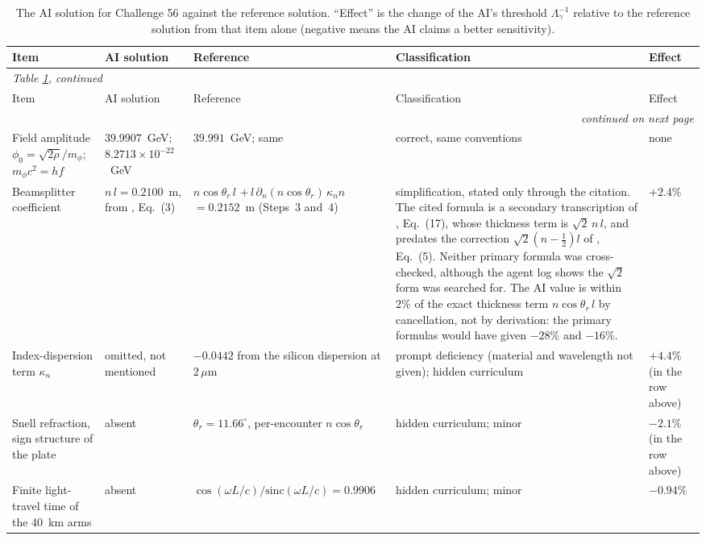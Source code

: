 \begingroup\footnotesize\setlength{\tabcolsep}{4pt}
\begin{longtable}{p{3.0cm}p{3.1cm}p{3.4cm}p{4.2cm}p{1.9cm}}
\caption{The AI solution for Challenge 56 against the reference solution. ``Effect'' is the change of the AI's threshold $\Lambda_\gamma^{-1}$ relative to the reference solution from that item alone (negative means the AI claims a better sensitivity).}\label{tab:ai56}\\
\toprule Item & AI solution & Reference & Classification & Effect \\ \midrule\midrule
\endfirsthead
\multicolumn{5}{l}{\textit{Table \ref{tab:ai56}, continued}}\\ \toprule Item & AI solution & Reference & Classification & Effect \\ \midrule\midrule
\endhead
\midrule \multicolumn{5}{r}{\textit{continued on next page}}\\
\endfoot
\bottomrule
\endlastfoot
Field amplitude $\phi_0=\sqrt{2\rho}/m_\phi$; $m_\phi c^2=hf$ & $39.9907$~GeV; $8.2713\times10^{-22}$~GeV & $39.991$~GeV; same & correct, same conventions & none \\
\midrule
Beamsplitter coefficient & $n\,l=0.2100$~m, from \citet{Miller2022}, Eq.~(3) & $n\cos\theta_r\,l$ \newline $+\,l\,\partial_n(n\cos\theta_r)\,\kappa_n n$ \newline $=0.2152$~m (Steps~3 and~4) & simplification, stated only through the citation. The cited formula is a secondary transcription of \citet{GroteStadnik2019}, Eq.~(17), whose thickness term is $\sqrt2\,n\,l$, and predates the correction $\sqrt2(n-\tfrac12)l$ of \citet{Vermeulen2021}, Eq.~(5). Neither primary formula was cross-checked, although the agent log shows the $\sqrt2$ form was searched for. The AI value is within $2\%$ of the exact thickness term $n\cos\theta_r\,l$ by cancellation, not by derivation: the primary formulas would have given $-28\%$ and $-16\%$. & $+2.4\%$ \\
\midrule
Index-dispersion term $\kappa_n$ & omitted, not mentioned & $-0.0442$ from the silicon dispersion at $2\,\mu$m & prompt deficiency (material and wavelength not given); hidden curriculum & $+4.4\%$ (in the row above) \\
\midrule
Snell refraction, sign structure of the plate & absent & $\theta_r=11.66^\circ$, per-encounter $n\cos\theta_r$ & hidden curriculum; minor & $-2.1\%$ (in the row above) \\
\midrule
Finite light-travel time of the $40$~km arms & absent & $\cos(\omega L/c)/\mathrm{sinc}(\omega L/c)=0.9906$ & hidden curriculum; minor & $-0.94\%$ \\

\end{longtable}
